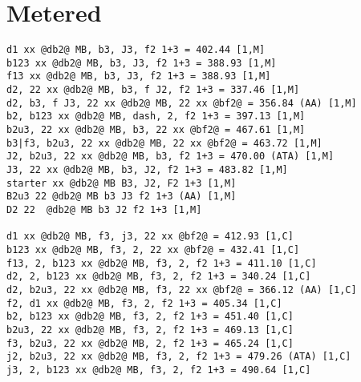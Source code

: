 \documentclass[main.tex]{subfiles}
\begin{document}




\section{Metered}


\begin{lstlisting}[language=FG]
d1 xx @db2@ MB, b3, J3, f2 1+3 = 402.44 [1,M]
b123 xx @db2@ MB, b3, J3, f2 1+3 = 388.93 [1,M]
f13 xx @db2@ MB, b3, J3, f2 1+3 = 388.93 [1,M]
d2, 22 xx @db2@ MB, b3, f J2, f2 1+3 = 337.46 [1,M]
d2, b3, f J3, 22 xx @db2@ MB, 22 xx @bf2@ = 356.84 (AA) [1,M]
b2, b123 xx @db2@ MB, dash, 2, f2 1+3 = 397.13 [1,M]
b2u3, 22 xx @db2@ MB, b3, 22 xx @bf2@ = 467.61 [1,M]
b3|f3, b2u3, 22 xx @db2@ MB, 22 xx @bf2@ = 463.72 [1,M]
J2, b2u3, 22 xx @db2@ MB, b3, f2 1+3 = 470.00 (ATA) [1,M]
J3, 22 xx @db2@ MB, b3, J2, f2 1+3 = 483.82 [1,M]
starter xx @db2@ MB B3, J2, F2 1+3 [1,M]
B2u3 22 @db2@ MB b3 J3 f2 1+3 (AA) [1,M]
D2 22  @db2@ MB b3 J2 f2 1+3 [1,M]

d1 xx @db2@ MB, f3, j3, 22 xx @bf2@ = 412.93 [1,C]
b123 xx @db2@ MB, f3, 2, 22 xx @bf2@ = 432.41 [1,C]
f13, 2, b123 xx @db2@ MB, f3, 2, f2 1+3 = 411.10 [1,C]
d2, 2, b123 xx @db2@ MB, f3, 2, f2 1+3 = 340.24 [1,C]
d2, b2u3, 22 xx @db2@ MB, f3, 22 xx @bf2@ = 366.12 (AA) [1,C] 
f2, d1 xx @db2@ MB, f3, 2, f2 1+3 = 405.34 [1,C]
b2, b123 xx @db2@ MB, f3, 2, f2 1+3 = 451.40 [1,C]
b2u3, 22 xx @db2@ MB, f3, 2, f2 1+3 = 469.13 [1,C]
f3, b2u3, 22 xx @db2@ MB, 2, f2 1+3 = 465.24 [1,C]
j2, b2u3, 22 xx @db2@ MB, f3, 2, f2 1+3 = 479.26 (ATA) [1,C]
j3, 2, b123 xx @db2@ MB, f3, 2, f2 1+3 = 490.64 [1,C]
\end{lstlisting}






\end{document}
